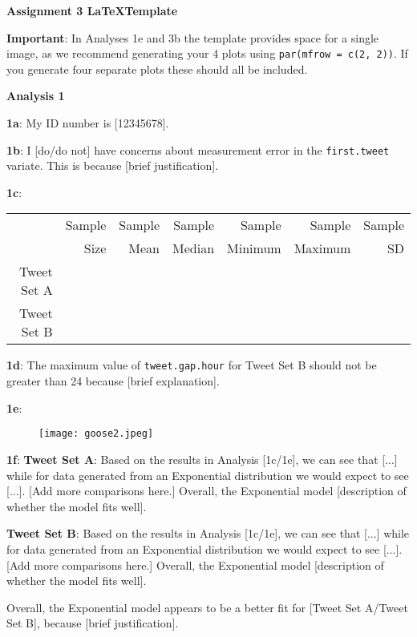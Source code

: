 \documentclass[a4paper,12pt]{article}
\begin{document}
\textbf{Assignment 3 \LaTeX Template}\bigskip

\textbf{Important}: In Analyses 1e and 3b the template provides space for a single image, as we recommend generating your 4 plots using \texttt{par(mfrow = c(2, 2))}. If you generate four separate plots these should all be included.\bigskip

\textbf{Analysis 1}\bigskip

\textbf{1a}: My ID number is [12345678].\bigskip

\textbf{1b}: I [do/do not] have concerns about measurement error in the \texttt{first.tweet} variate. This is because [brief justification].\bigskip

\textbf{1c}:

\begin{center}
\begin{tabular}{|r | r | r | r | r | r | r| }\hline
 & Sample & Sample & Sample & Sample & Sample & Sample \\
 & Size & Mean & Median & Minimum & Maximum & SD\\\hline
Tweet Set A &   &   &   &   &   &   \\
Tweet Set B &   &   &   &   &   &   \\ \hline
\end{tabular}
\end{center}

\textbf{1d}: The maximum value of \texttt{tweet.gap.hour} for Tweet Set B should not be greater than 24 because [brief explanation].\bigskip

\textbf{1e}:

\begin{figure}[H]
     \centering
     \texttt{[image: goose2.jpeg]}
\end{figure}




\textbf{1f}: \textbf{Tweet Set A}: Based on the results in Analysis [1c/1e], we can see that [...] while for data generated from an Exponential distribution we would expect to see [...]. [Add more comparisons here.] Overall, the Exponential model [description of whether the model fits well].\bigskip

\textbf{Tweet Set B}: Based on the results in Analysis [1c/1e], we can see that [...] while for data generated from an Exponential distribution we would expect to see [...]. [Add more comparisons here.] Overall, the Exponential model [description of whether the model fits well].

Overall, the Exponential model appears to be a better fit for [Tweet Set A/Tweet Set B], because [brief justification].\bigskip
\end{document}

